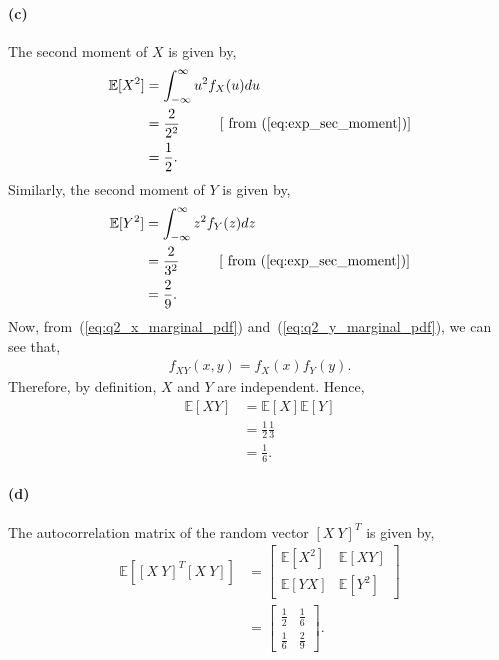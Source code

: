 \paragraph{(c)}The second moment of $X$ is given by,
\begin{align}\label{eq:q2_x_sec_moment}
	\mathbb{E}[X^2] &= \int_{-\infty}^{\infty} u^2f_X(u) du\nonumber\\
	&= \frac{2}{2^2}\hspace{1cm} [\text{ from }(\ref{eq:exp_sec_moment})]\nonumber\\
	&= \frac{1}{2}.
\end{align}
Similarly, the second moment of $Y$ is given by,
\begin{align}\label{eq:q2_y_sec_moment}
	\mathbb{E}[Y^2] &= \int_{-\infty}^{\infty} z^2f_Y(z) dz\nonumber\\
	&= \frac{2}{3^2}\hspace{1cm} [\text{ from }(\ref{eq:exp_sec_moment})]\nonumber\\
	&= \frac{2}{9}.
\end{align}
Now, from~(\ref{eq:q2_x_marginal_pdf}) and~(\ref{eq:q2_y_marginal_pdf}), we can see that,
\begin{align}\label{eq:q2_xy_independent}
	f_{XY}(x,y) = f_X(x)f_Y(y).
\end{align}
Therefore, by definition, $X$ and $Y$ are independent. Hence,
\begin{align}\label{eq:q2_xy_mean}
	\mathbb{E}[XY] &= \mathbb{E}[X]\mathbb{E}[Y]\nonumber\\
	&= \frac{1}{2}\frac{1}{3}\nonumber\\
	&= \frac{1}{6}.
\end{align}
\paragraph{(d)}The autocorrelation matrix of the random vector $[X\ Y]^T$ is given by,
\begin{align}
	 \mathbb{E}[[X\ Y]^T [X\ Y]] &= \begin{bmatrix}\mathbb{E}[X^2]&\mathbb{E}[XY]\\\mathbb{E}[YX]&\mathbb{E}[Y^2]\end{bmatrix}\nonumber\\
	 &= \begin{bmatrix}\frac{1}{2}&\frac{1}{6}\\\frac{1}{6}&\frac{2}{9}\end{bmatrix}.
\end{align}
